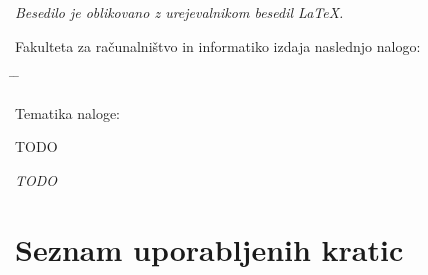 \documentclass[a4paper, 12pt]{book}
\newcommand{\clearemptydoublepage}{\newpage{\pagestyle{empty}\cleardoublepage}}
\begin{document}
\begin{center}
\mbox{}\vfill
\emph{Besedilo je oblikovano z urejevalnikom besedil \LaTeX.}
\end{center}
\clearemptydoublepage

\thispagestyle{empty}
\vspace*{4cm}

\noindent
Fakulteta za računalništvo in informatiko izdaja naslednjo nalogo:
\medskip
\begin{tabbing}
\hspace{32mm}\= \hspace{6cm} \= \kill




Tematika naloge:
\end{tabbing}
TODO
\vspace{15mm}






\vspace{2cm}

\clearemptydoublepage

\thispagestyle{empty}\mbox{}\vfill\null\it%
\noindent
TODO
\rm\normalfont

\clearemptydoublepage


\clearemptydoublepage


\pagestyle{empty}
\def\thepage{}%
\tableofcontents{}


\clearemptydoublepage


\chapter*{Seznam uporabljenih kratic}  %

\end{document}

